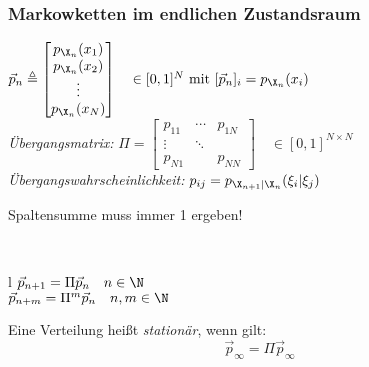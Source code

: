 \documentclass[german,color,6pt]{latex4ei/latex4ei_sheet}
\begin{document}
\begin{sectionbox}
	\subsubsection{Markowketten im endlichen Zustandsraum}
	$\vec{p}_{n} \triangleq \begin{bmatrix} p_{\X_{n}}(x_{1}) \\ p_{\X_{n}}(x_{2}) \\ \vdots \\ p_{\X_{n}}(x_{N}) \end{bmatrix} \quad \in [0,1]^{N}\text{ mit }[\vec{p}_{n}]_{i} = p_{\X_{n}}(x_{i})$ \\
	\emph{Übergangsmatrix:}
	 $\Pi = \begin{bmatrix} p_{11} & \cdots & p_{1N} \\ \vdots & \ddots &   \\ p_{N1} & & p_{NN} \end{bmatrix} \quad \in [0,1]^{N \times N}$\\

	 \emph{Übergangswahrscheinlichkeit:} $p_{ij} = p_{\X_{n+1}|\X_n}(\xi_i|\xi_j)$ \\
	 \centerline{Spaltensumme muss immer 1 ergeben!}\\
	 \begin{tablebox}{l}
		 $\vec{p}_{n+1}  = \Pi \vec{p}_{n} \quad n \in \N$ \\
		 $\vec{p}_{n+m}  = \Pi^{m} \vec{p}_{n} \quad n, m \in \N$
	 \end{tablebox}
	 Eine Verteilung heißt \emph{stationär}, wenn gilt:\\
	\[\vec{p}_{\infty}  = \Pi \vec{p}_{\infty} \]
\end{sectionbox}


\end{document}
